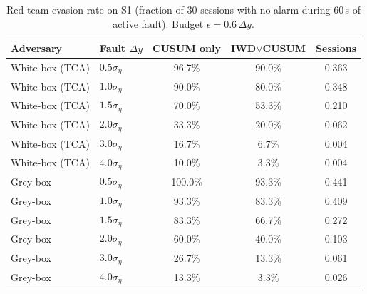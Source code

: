 \begin{table}[t]
\centering
\caption{Red-team evasion rate on S1 (fraction of 30 sessions with
no alarm during 60\,s of active fault). Budget $\epsilon = 0.6\,\Delta y$.}
\label{tab:redteam_results}
\small
\begin{tabular}{@{}llccc@{}}
\toprule
\textbf{Adversary} & \textbf{Fault} $\Delta y$ &
\textbf{CUSUM only} & \textbf{IWD$\vee$CUSUM} & \textbf{Sessions} \\
\midrule
White-box (TCA) & $0.5\sigma_\eta$ & 96.7\% & 90.0\% & 0.363 \\
White-box (TCA) & $1.0\sigma_\eta$ & 90.0\% & 80.0\% & 0.348 \\
White-box (TCA) & $1.5\sigma_\eta$ & 70.0\% & 53.3\% & 0.210 \\
White-box (TCA) & $2.0\sigma_\eta$ & 33.3\% & 20.0\% & 0.062 \\
White-box (TCA) & $3.0\sigma_\eta$ & 16.7\% & 6.7\% & 0.004 \\
White-box (TCA) & $4.0\sigma_\eta$ & 10.0\% & 3.3\% & 0.004 \\
\midrule
Grey-box        & $0.5\sigma_\eta$ & 100.0\% & 93.3\% & 0.441 \\
Grey-box        & $1.0\sigma_\eta$ & 93.3\% & 83.3\% & 0.409 \\
Grey-box        & $1.5\sigma_\eta$ & 83.3\% & 66.7\% & 0.272 \\
Grey-box        & $2.0\sigma_\eta$ & 60.0\% & 40.0\% & 0.103 \\
Grey-box        & $3.0\sigma_\eta$ & 26.7\% & 13.3\% & 0.061 \\
Grey-box        & $4.0\sigma_\eta$ & 13.3\% & 3.3\% & 0.026 \\
\bottomrule
\end{tabular}
\end{table}